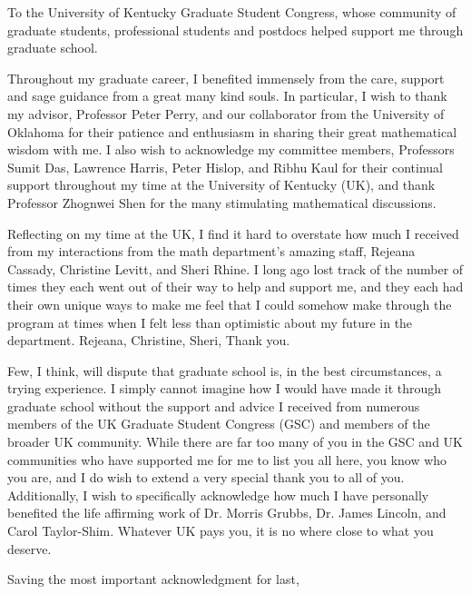\documentclass[final, leqno]{ukthesis}
\numberwithin{equation}{chapter}
\begin{document}
\frontmatter
\maketitle
\begin{dedication}
	To the University of Kentucky Graduate Student Congress, whose community of graduate students, 
	professional students and postdocs helped support me through graduate school.
\end{dedication}
\begin{acknowledgments}
	Throughout my graduate career, I benefited immensely from the care, support and 
	sage guidance from a great many kind souls. In particular, I wish to thank my advisor, 
	Professor Peter Perry, and our collaborator from the University of Oklahoma for
	their patience and enthusiasm in sharing their great mathematical wisdom with me.
	I also wish to acknowledge my committee members, Professors Sumit Das, Lawrence 
	Harris, Peter Hislop, and Ribhu Kaul for their continual support throughout my 
	time at the University of Kentucky (UK), and thank Professor Zhognwei Shen 
	for the many stimulating mathematical discussions.

	Reflecting on my time at the UK, I find it hard to overstate 
	how much I received from my interactions from the math department's amazing 
	staff, Rejeana Cassady, Christine Levitt, and Sheri Rhine. I long ago lost 
	track of the number of times they each went out of their way to help and 
	support me, and they each had their own unique ways to make me feel that 
	I could somehow make through the program at times when I felt less
	than optimistic about my future in the department. Rejeana, Christine, Sheri,
	Thank you.

	Few, I think, will dispute that graduate school is, in the best circumstances,
	a trying experience. I simply cannot imagine how I would have made it through
	graduate school without the support and advice I received from numerous members
	of the UK Graduate Student Congress (GSC) and members of the 
	broader UK community. While there are far too many of you in the GSC and 
	UK communities who have supported me for me to list you all here, you know who 
	you are, and I do wish to extend a very special thank you to all of you. 
	Additionally, I wish to specifically acknowledge how much I have personally 
	benefited the life affirming work of Dr. Morris Grubbs, Dr. James Lincoln, and 
	Carol Taylor-Shim. Whatever UK pays you, it is no where close to what you 
	deserve.

	Saving the most important acknowledgment for last, 
\end{acknowledgments}
\end{document}
